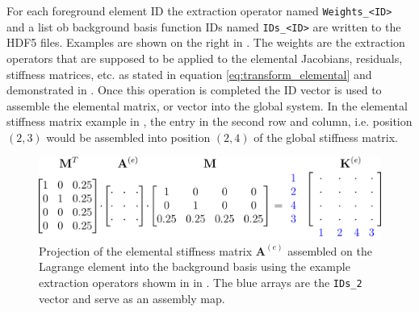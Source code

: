 \newpage

For each foreground element ID the extraction operator named \texttt{Weights\_<ID>} and a list ob background basis function IDs named \texttt{IDs\_<ID>} are written to the HDF5 files. Examples are shown on the right in . The weights are the extraction operators that are supposed to be applied to the elemental Jacobians, residuals, stiffness matrices, etc. as stated in equation \eqref{eq:transform_elemental} and demonstrated in . Once this operation is completed the ID vector is used to assemble the elemental matrix, or vector into the global system. In the elemental stiffness matrix example in , the entry in the second row and column, i.e. position $(2,3)$ would be assembled into position $(2,4)$ of the global stiffness matrix.

\begin{figure}[h]
    \begin{center}
    \includegraphics[width=12cm]{Figures/assembly.png}
    \caption{Projection of the elemental stiffness matrix $\bm{A}^{(e)}$ assembled on the Lagrange element into the background basis using the example extraction operators showm in in . The blue arrays are the \texttt{IDs\_2} vector and serve as an assembly map.} 
    \label{fig:assembly}
    \end{center}
\end{figure}



